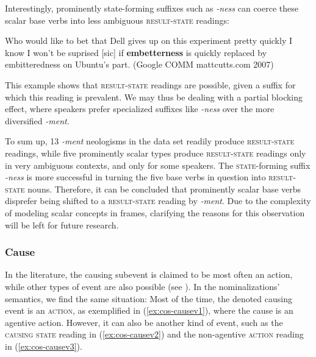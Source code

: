 \noindent Interestingly, prominently state-forming suffixes such as \textit{-ness} can coerce these scalar base verbs into less ambiguous \textsc{result-state} readings:

\begin{exe}
  \ex \label{ex:ness-rs} Who would like to bet that Dell gives up on this experiment pretty quickly  \textendash{}  I know I won't be suprised [sic] if \textbf{embetterness} is quickly replaced by embitteredness on Ubuntu's part. {\small(Google COMM mattcutts.com 2007)}
\end{exe}

\noindent This example shows that \textsc{result-state} readings are possible, given a suffix for which this reading is prevalent. We may thus be dealing with a partial blocking effect, where speakers prefer specialized suffixes like \textit{-ness} over the more diversified \textit{-ment}.

To sum up, 13 \textit{-ment} neologisms in the data set readily produce \textsc{result-state} readings, while five prominently scalar types produce \textsc{result-state} readings only in very ambiguous contexts, and only for some speakers. 
The \textsc{state-}forming suffix \textit{-ness} is more successful in turning the five base verbs in question into \textsc{result-state} nouns. Therefore, it can be concluded that prominently scalar base verbs disprefer being shifted to a \textsc{result-state} reading by \textit{-ment}. Due to the complexity of modeling scalar concepts in frames, clarifying the reasons for this observation will be left for future research. 

\subsubsection{{Cause}}
\label{sec:cos-output-survey-caus}

In the literature, the causing subevent is claimed to be most often an action, while other types of event are also possible (see ). 
In the nominalizations' semantics, we find the same situation: Most of the time, the denoted causing event is an \textsc{action}, as exemplified in (\ref{ex:cos-causev1}), where the cause is an agentive action. However, it can also be another kind of event, such as the \textsc{causing state} reading in (\ref{ex:cos-causev2}) and the non-agentive \textsc{action} reading in (\ref{ex:cos-causev3}). 

